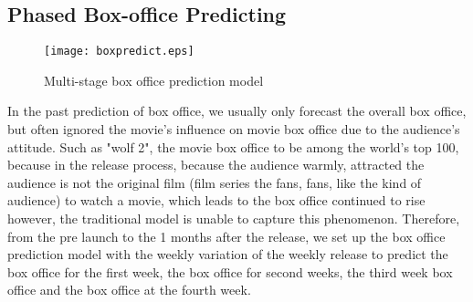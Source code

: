 \subsection{Phased Box-office Predicting}
\begin{figure}[!htbp]
\centering
\texttt{[image: boxpredict.eps]}
\caption{Multi-stage box office prediction model}
\label{fig:mhin}
\end{figure}
In the past prediction of box office, we usually only forecast the overall box office, but often ignored the movie's influence on movie box office due to the audience's attitude. Such as "wolf 2", the movie box office to be among the world's top 100, because in the release process, because the audience warmly, attracted the audience is not the original film (film series the fans, fans, like the kind of audience) to watch a movie, which leads to the box office continued to rise however, the traditional model is unable to capture this phenomenon. Therefore, from the pre launch to the 1 months after the release, we set up the box office prediction model with the weekly variation of the weekly release to predict the box office for the first week, the box office for second weeks, the third week box office and the box office at the fourth week.\\

